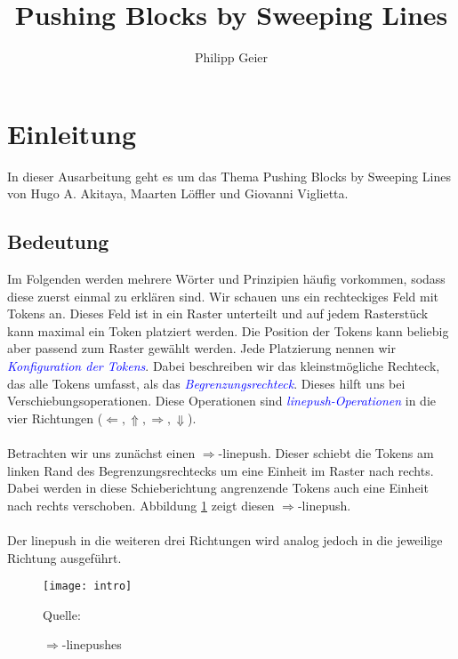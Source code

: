 \documentclass[seminar,german]{algothesis}
\title{Pushing Blocks by Sweeping Lines} %
\author{Philipp Geier} %
\newcommand*{\quelle}{%
  \footnotesize Quelle:
}
\begin{document}
\setcounter{page}{1}
\section{Einleitung}
In dieser Ausarbeitung geht es um das Thema \glqq Pushing Blocks by Sweeping Lines \grqq{} von Hugo A. Akitaya, Maarten Löffler und Giovanni Viglietta. 
\subsection{Bedeutung}
Im Folgenden werden mehrere Wörter und Prinzipien häufig vorkommen, sodass diese zuerst einmal zu erklären sind. Wir schauen uns ein rechteckiges Feld mit Tokens an. Dieses Feld ist in  ein Raster unterteilt und auf jedem Rasterstück kann maximal ein Token platziert werden. Die Position der Tokens kann beliebig aber passend zum Raster gewählt werden. Jede Platzierung nennen wir \textit{\textcolor{blue}{Konfiguration der Tokens}}.  Dabei beschreiben wir das kleinstmögliche Rechteck, das alle Tokens umfasst, als das \textit{\textcolor{blue}{Begrenzungsrechteck}}. Dieses hilft uns bei Verschiebungsoperationen. Diese Operationen sind \textit{\textcolor{blue}{\glqq linepush\grqq{}-Operationen}} in die vier Richtungen ($\Leftarrow, \Uparrow, \Rightarrow, \Downarrow$). 
\\\\
Betrachten wir uns zunächst einen $\Rightarrow$-linepush. Dieser schiebt die Tokens am linken Rand des Begrenzungsrechtecks um eine Einheit im Raster nach rechts. Dabei werden in diese Schieberichtung angrenzende Tokens auch eine Einheit nach rechts verschoben. Abbildung \ref{fig:1} zeigt diesen $\Rightarrow$-linepush. 
\\\\
Der linepush in die weiteren drei Richtungen wird analog jedoch in die jeweilige Richtung ausgeführt.\\
\begin{figure}[ht]
	\centering
	\texttt{[image: intro]}
	\caption{$\Rightarrow$-linepushes}
	\quelle\cite{akitaya2022pushing}
	\label{fig:1}
\end{figure}

\newpage
\end{document}
